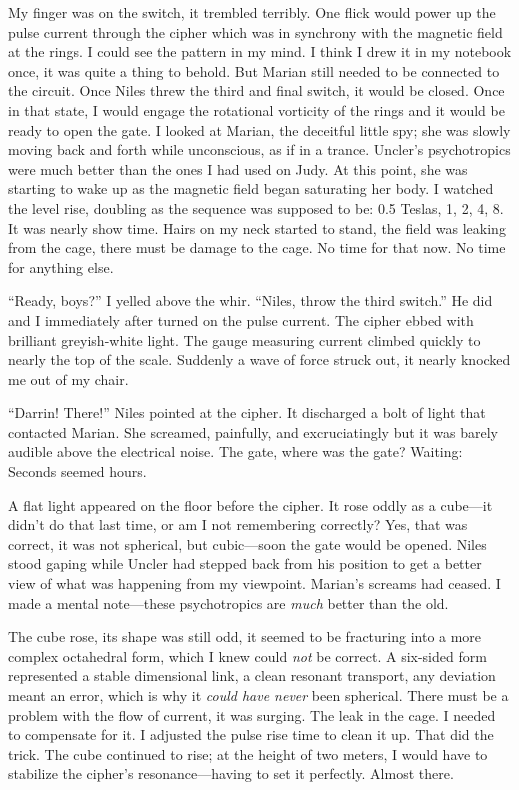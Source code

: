 \documentclass[
]{article}
\begin{document}
My finger was on the switch, it trembled terribly. One flick would power
up the pulse current through the cipher which was in synchrony with the
magnetic field at the rings. I could see the pattern in my mind. I think
I drew it in my notebook once, it was quite a thing to behold. But
Marian still needed to be connected to the circuit. Once Niles threw the
third and final switch, it would be closed. Once in that state, I would
engage the rotational vorticity of the rings and it would be ready to
open the gate. I looked at Marian, the deceitful little spy; she was
slowly moving back and forth while unconscious, as if in a trance.
Uncler's psychotropics were much better than the ones I had used on
Judy. At this point, she was starting to wake up as the magnetic field
began saturating her body. I watched the level rise, doubling as the
sequence was supposed to be: 0.5 Teslas, 1, 2, 4, 8. It was nearly show
time. Hairs on my neck started to stand, the field was leaking from the
cage, there must be damage to the cage. No time for that now. No time
for anything else.

``Ready, boys?'' I yelled above the whir. ``Niles, throw the third
switch.'' He did and I immediately after turned on the pulse current.
The cipher ebbed with brilliant greyish-white light. The gauge measuring
current climbed quickly to nearly the top of the scale. Suddenly a wave
of force struck out, it nearly knocked me out of my chair.

``Darrin! There!'' Niles pointed at the cipher. It discharged a bolt of
light that contacted Marian. She screamed, painfully, and excruciatingly
but it was barely audible above the electrical noise. The gate, where
was the gate? Waiting: Seconds seemed hours.

A flat light appeared on the floor before the cipher. It rose oddly as a
cube---it didn't do that last time, or am I not remembering correctly?
Yes, that was correct, it was not spherical, but cubic---soon the gate
would be opened. Niles stood gaping while Uncler had stepped back from
his position to get a better view of what was happening from my
viewpoint. Marian's screams had ceased. I made a mental note---these
psychotropics are \emph{much} better than the old.

The cube rose, its shape was still odd, it seemed to be fracturing into
a more complex octahedral form, which I knew could \emph{not} be
correct. A six-sided form represented a stable dimensional link, a clean
resonant transport, any deviation meant an error, which is why it
\emph{could have never} been spherical. There must be a problem with the
flow of current, it was surging. The leak in the cage. I needed to
compensate for it. I adjusted the pulse rise time to clean it up. That
did the trick. The cube continued to rise; at the height of two meters,
I would have to stabilize the cipher's resonance---having to set it
perfectly. Almost there.
\end{document}
